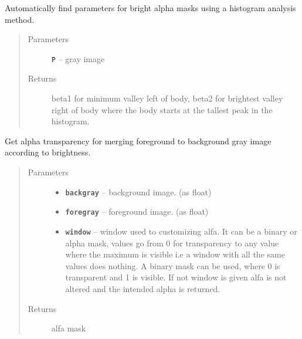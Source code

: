 \documentclass[letterpaper,10pt,english]{sphinxmanual}
\begin{document}
\begin{fulllineitems}
\label{RRtoolbox.tools:RRtoolbox.tools.segmentation.get_beta_params_hist}
Automatically find parameters for bright alpha masks
using a histogram analysis method.
\begin{quote}\begin{description}
\item[{Parameters}] \leavevmode
\textbf{\texttt{P}} -- gray image

\item[{Returns}] \leavevmode
beta1 for minimum valley left of body, beta2 for brightest valley right of body
where the body starts at the tallest peak in the histogram.

\end{description}\end{quote}

\end{fulllineitems}


\begin{fulllineitems}
\label{RRtoolbox.tools:RRtoolbox.tools.segmentation.get_bright_alpha}
Get alpha transparency for merging foreground to
background gray image according to brightness.
\begin{quote}\begin{description}
\item[{Parameters}] \leavevmode\begin{itemize}
\item {} 
\textbf{\texttt{backgray}} -- background image. (as float)

\item {} 
\textbf{\texttt{foregray}} -- foreground image. (as float)

\item {} 
\textbf{\texttt{window}} -- window used to customizing alfa. It can be a binary or alpha mask,
values go from 0 for transparency to any value where the maximum is visible
i.e a window with all the same values does nothing. A binary mask can be used,
where 0 is transparent and 1 is visible. If not window is given alfa is not
altered and the intended alpha is returned.

\end{itemize}

\item[{Returns}] \leavevmode
alfa mask

\end{description}\end{quote}

\end{fulllineitems}
\end{document}
